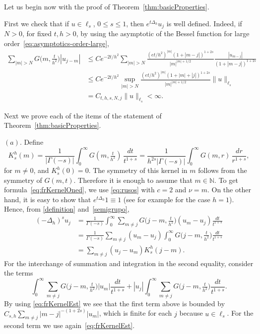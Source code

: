 \documentclass[a4paper,11pt,reqno]{amsart}
\newcommand{\N}{\mathbb{N}}
\theoremstyle{definition}
\numberwithin{equation}{section}
\begin{document}
Let us begin now with the proof of Theorem~\ref{thm:basicProperties}.

First we check that if $u\in\ell_{s}$, $0\leq s\leq1$, then
$e^{t\Delta_h}u_{j}$ is well defined. Indeed, if $N>0$, for fixed $t,h>0$,
by using the asymptotic of the Bessel function for large order~\eqref{eq:asymptotics-order-large},
\begin{equation}
\label{eq:cuentita}
\begin{aligned}
\sum_{|m|>N}G\big(m,\tfrac{t}{h^2}\big)|u_{j-m}| &\le
Ce^{-2t/h^2} \sum_{|m|>N} \frac{(et/h^2)^{|m|}(1+|m-j|)^{1+2s}}
{|m|^{|m|+1/2}} \frac{|u_{m-j}|}{(1+|m-j|)^{1+2s}}\\
&\leq Ce^{-2t/h^2} \sup_{ |m|>N}\frac{(et/h^2)^{|m|}(1+|m|+|j|)^{1+2s}}
{|m|^{|m|+1/2}}\|u\|_{\ell_s}\\
&= C_{t,h,s,N,j}\|u\|_{\ell_s}<\infty.
\end{aligned}
\end{equation}

Next we prove each of the items of the statement of Theorem~\ref{thm:basicProperties}.

\noindent$(a)$. Define
\begin{equation}
\label{eq:kernelFrLaplacian}
K_s^h(m) = \frac1{|\Gamma(-s)|} \int_0^\infty G(m,\tfrac{t}{h^2})\,\frac{dt}{t^{1+s}}
=\frac{1}{h^{2s}|\Gamma(-s)|}\int_0^\infty G(m,r)\,\frac{dr}{r^{1+s}},
\end{equation}
for $m\neq 0$, and $K^h_s(0) =0$. The symmetry of this kernel in $m$ follows from the symmetry of $G(m,t)$.
Therefore it is enough to assume that $m\in \N$. To get formula~\eqref{eq:frKernelOned},
we use \eqref{eq:rusos} with $c=2$ and $\nu=m$. On the other hand,
it is easy to show that $e^{t\Delta_h}1\equiv1$
(see for example \cite{FiveGuys} for the case $h=1$). Hence, from \eqref{definition} and~\eqref{semigrupo},
\begin{align*}
(-\Delta_h)^su_{j}
&= \frac{1}{\Gamma(-s)} \int_0^\infty \sum_{m\neq j}
G\big(j-m,\tfrac{t}{h^2}\big)(u_{m}-u_{j}) \frac{dt}{t^{1+s}} \\
&= \frac{1}{\Gamma(-s)} \sum_{m\neq j} (u_{m}-u_{j})\int_0^\infty
G\big(j-m,\tfrac{t}{h^2}\big) \frac{dt}{t^{1+s}} \\
&= \sum_{m\neq j}(u_{j}-u_{m})K^h_{s}(j-m).
\end{align*}
For the interchange of summation and integration in the second equality, consider the terms
\[
\int_0^\infty \sum_{m\neq j}
G\big(j-m,\tfrac{t}{h^2}\big)|u_{m}| \frac{dt}{t^{1+s}}
+|u_{j}| \int_0^\infty \sum_{m\neq j}
G\big(j-m,\tfrac{t}{h^2}\big)\frac{dt}{t^{1+s}}.
\]
By using \eqref{eq:frKernelEst} we see that
the first term above is bounded
by $C_{s,h}\sum_{m\neq j}|m-j|^{-(1+2s)}|u_{m}|$, which is finite for each $j$
because $u\in \ell_{s}$. For the second term we use again~\eqref{eq:frKernelEst}.
\end{document}
